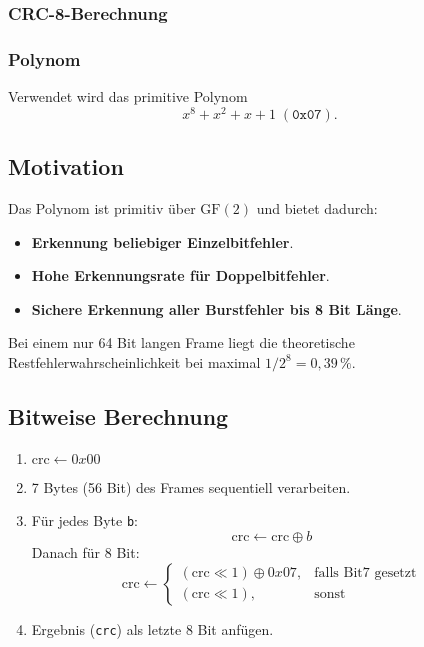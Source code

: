 \documentclass[main.tex]{subfiles} %
\begin{document}
\newpage
\subsubsection*{CRC-8-Berechnung}

\subsubsection*{Polynom}
Verwendet wird das primitive Polynom
\[
  x^{8} + x^{2} + x + 1 \;(\texttt{0x07}).
\]

\subsection*{Motivation}
Das Polynom ist primitiv über \(\mathrm{GF}(2)\) und bietet dadurch:
\begin{itemize}
  \item \textbf{Erkennung beliebiger Einzelbitfehler}.
  \item \textbf{Hohe Erkennungsrate für Doppelbitfehler}.
  \item \textbf{Sichere Erkennung aller Burstfehler bis 8 Bit Länge}.
\end{itemize}
Bei einem nur 64 Bit langen Frame liegt die theoretische
Restfehlerwahrscheinlichkeit bei maximal \(1/2^{8}=0{,}39\,\%\).

\subsection*{Bitweise Berechnung}
\begin{enumerate}
  \item \(\text{crc} \gets 0x00\)
  \item 7 Bytes (56 Bit) des Frames sequentiell verarbeiten.
  \item Für jedes Byte \texttt{b}:
    \[
      \text{crc} \gets \text{crc} \oplus b
    \]
    Danach für 8 Bit:
    \[
      \text{crc} \gets
      \begin{cases}
        (\text{crc}\ll1) \oplus 0x07, & \text{falls Bit7 gesetzt} \\
        (\text{crc}\ll1),            & \text{sonst}
      \end{cases}
    \]
  \item Ergebnis (\texttt{crc}) als letzte 8 Bit anfügen.
\end{enumerate}

\end{document}
